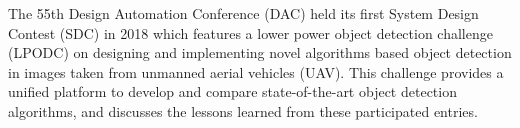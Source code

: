 \documentclass[10pt,journal,compsoc]{IEEEtran}
\begin{document}
%
\IEEEpeerreviewmaketitle







%
%
%
%

The 55th Design Automation Conference (DAC) held its first System Design Contest (SDC) in 2018 which features a lower power object detection challenge (LPODC) on designing and implementing novel algorithms based object detection in images taken from unmanned aerial vehicles (UAV).
This challenge provides a unified platform to develop and compare state-of-the-art object detection algorithms, and discusses the lessons learned from these participated entries.
\end{document}
